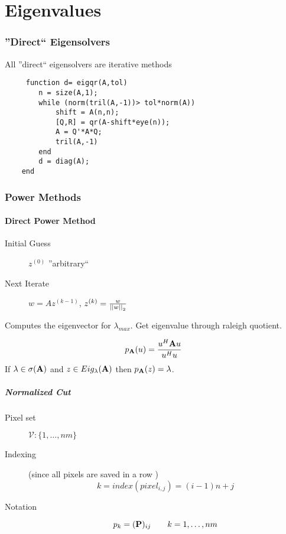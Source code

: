 \part{Eigenvalues}

\section{''Direct`` Eigensolvers}
	All ''direct`` eigensolvers are iterative methods
	\begin{lstlisting}
	 function d= eigqr(A,tol)
		n = size(A,1);
		while (norm(tril(A,-1))> tol*norm(A))
			shift = A(n,n);
			[Q,R] = qr(A-shift*eye(n));
			A = Q'*A*Q;
			tril(A,-1)
		end
		d = diag(A);
	end
	\end{lstlisting}

\section{Power Methods}
	\subsection{Direct Power Method}
		\begin{description}
		 \item[Initial Guess] $z^{(0)}$ ''arbitrary``
		 \item[Next Iterate] $w = A z^{(k-1)}$, $z^{(k)} = \frac{w}{\left|\left| w \right|\right|_2}$
		\end{description}
		Computes the eigenvector for $\lambda_{max}$. Get eigenvalue through raleigh quotient.
	\begin{definition}
	 \[
	  p_{\mathbf{A}}(u) = \frac{u^H \mathbf{A} u}{u^H u}
	 \]
	 If $\lambda \in \sigma(\mathbf{A})$ and $z \in Eig_{\lambda}(\mathbf{A})$ then $p_{\mathbf{A}}(z) = \lambda$.
	\end{definition}

		\subsubsection{Normalized Cut}
			\begin{description}
			\item[Pixel set] $\mathcal V: \{1,\ldots,nm\}$
			\item[Indexing] (since all pixels are saved in a row )
				\[
				k = index(pixel_{i,j}) = (i-1)n + j
				\]
			\item[Notation]
				\[
				p_k = (\mathbf{P})_{ij}\qquad k = 1, \ldots, nm
				\]
			\end{description}
			
